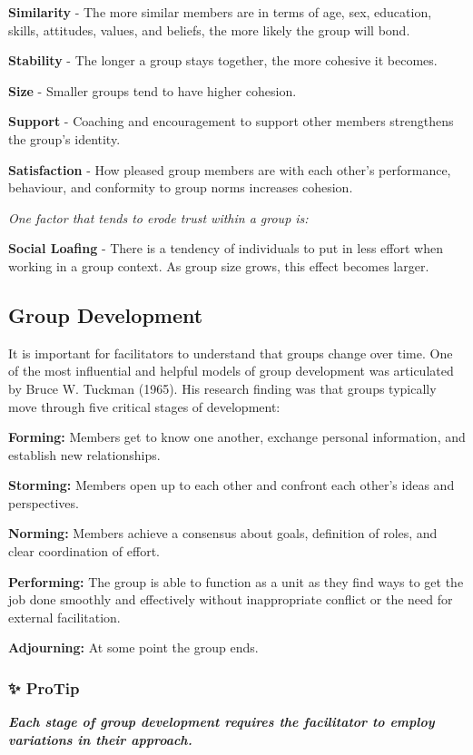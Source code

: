 \documentclass[
]{book}
\begin{document}
\textbf{Similarity} - The more similar members are in terms of age, sex, education, skills, attitudes, values, and beliefs, the more likely the group will bond.

\textbf{Stability} - The longer a group stays together, the more cohesive it becomes.

\textbf{Size} - Smaller groups tend to have higher cohesion.

\textbf{Support} - Coaching and encouragement to support other members strengthens the group's identity.

\textbf{Satisfaction} - How pleased group members are with each other's performance, behaviour, and conformity to group norms increases cohesion.

\emph{One factor that tends to erode trust within a group is:}

\textbf{Social Loafing} - There is a tendency of individuals to put in less effort when working in a group context. As group size grows, this effect becomes larger.

\hypertarget{group-development}{%
\subsection*{Group Development}\label{group-development}}

It is important for facilitators to understand that groups change over time. One of the most influential and helpful models of group development was articulated by Bruce W. Tuckman (1965). His research finding was that groups typically move through five critical stages of development:

\textbf{Forming:} Members get to know one another, exchange personal information, and establish new relationships.

\textbf{Storming:} Members open up to each other and confront each other's ideas and perspectives.

\textbf{Norming:} Members achieve a consensus about goals, definition of roles, and clear coordination of effort.

\textbf{Performing:} The group is able to function as a unit as they find ways to get the job done smoothly and effectively without inappropriate conflict or the need for external facilitation.

\textbf{Adjourning:} At some point the group ends.

\begin{blank}
\hypertarget{protip}{%
\subsubsection*{✨ ProTip}\label{protip}}

\textbf{\emph{Each stage of group development requires the facilitator to employ variations in their approach.}}
\end{blank}
\end{document}

